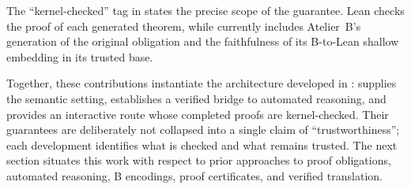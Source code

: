 The ``kernel-checked'' tag in  states the precise
scope of the guarantee. Lean checks the proof of each generated theorem, while
\barrel currently includes Atelier~B's generation of the original obligation
and the faithfulness of its B-to-Lean shallow embedding in its trusted base.

\begin{quote}\small

  \medskip
\end{quote}

Together, these contributions instantiate the architecture developed in
: \zflean supplies the semantic setting, \beer
establishes a verified bridge to automated reasoning, and \barrel provides an
interactive route whose completed proofs are kernel-checked. Their guarantees
are deliberately not collapsed into a single claim of ``trustworthiness'';
each development identifies what is checked and what remains trusted. The next
section situates this work with respect to prior approaches to proof obligations,
automated reasoning, B encodings, proof certificates, and verified translation.
